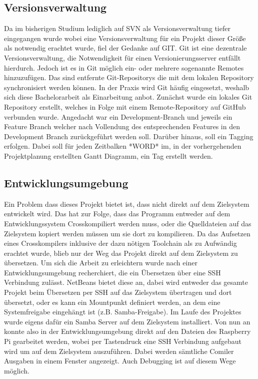 \subsection{Versionsverwaltung}
Da im bisherigen Studium lediglich auf SVN als Versionsverwaltung tiefer eingegangen wurde wobei eine Versionsverwaltung für ein Projekt dieser Größe als notwendig erachtet wurde, fiel der Gedanke auf GIT. Git ist eine dezentrale Versionsverwaltung, die Notwendigkeit für einen Versionierungsserver entfällt hierdurch. Jedoch ist es in Git möglich ein- oder mehrere sogenannte Remotes hinzuzufügen. Das sind entfernte Git-Repositorys die mit dem lokalen Repository synchronisiert werden können. In der Praxis wird Git häufig eingesetzt, weshalb sich diese Bachelorarbeit als Einarbeitung anbot. Zunächst wurde ein lokales Git Repository erstellt, welches in Folge mit einem Remote-Repository auf GitHub verbunden wurde. Angedacht war ein Development-Branch und jeweils ein Feature Branch welcher nach Vollendung des entsprechenden Features in den Development Branch zurückgeführt werden soll. Darüber hinaus, soll ein Tagging erfolgen. Dabei soll für jeden Zeitbalken *WORD* im, in der vorhergehenden Projektplanung erstellten Gantt Diagramm, ein Tag erstellt werden. 

\subsection{Entwicklungsumgebung}
Ein Problem dass dieses Projekt bietet ist, dass nicht direkt auf dem Zielsystem entwickelt wird. Das hat zur Folge, dass das Programm entweder auf dem Entwicklungssystem Crosskompiliert werden muss, oder die Quelldateien auf das Zielsystem kopiert werden müssen um sie dort zu kompilieren. Da das Aufsetzen eines Crosskompilers inklusive der dazu nötigen Toolchain als zu Aufwändig erachtet wurde, blieb nur der Weg das Projekt direkt auf dem Zielsystem zu übersetzen. Um sich die Arbeit zu erleichtern wurde nach einer Entwicklungsumgebung recherchiert, die ein Übersetzen über eine SSH Verbindung zulässt. NetBeans bietet diese an, dabei wird entweder das gesamte Projekt beim Übersetzen per SSH auf das Zielsystem übertragen und dort übersetzt, oder es kann ein Mountpunkt definiert werden, an dem eine Systemfreigabe eingehängt ist (z.B. Samba-Freigabe). Im Laufe des Projektes wurde eigens dafür ein Samba Server auf dem Zielsystem installiert. Von nun an konnte also in der Entwicklungsumgebung direkt auf den Dateien des Raspberry Pi gearbeitet werden, wobei per Tastendruck eine SSH Verbindung aufgebaut wird um auf dem Zielsystem  auszuführen. Dabei werden sämtliche Comiler Ausgaben in einem Fenster angezeigt. Auch Debugging ist auf diesem Wege möglich.

